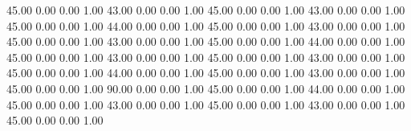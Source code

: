    45.00   0.00   0.00   1.00
   43.00   0.00   0.00   1.00
   45.00   0.00   0.00   1.00
   43.00   0.00   0.00   1.00
   45.00   0.00   0.00   1.00
   44.00   0.00   0.00   1.00
   45.00   0.00   0.00   1.00
   43.00   0.00   0.00   1.00
   45.00   0.00   0.00   1.00
   43.00   0.00   0.00   1.00
   45.00   0.00   0.00   1.00
   44.00   0.00   0.00   1.00
   45.00   0.00   0.00   1.00
   43.00   0.00   0.00   1.00
   45.00   0.00   0.00   1.00
   43.00   0.00   0.00   1.00
   45.00   0.00   0.00   1.00
   44.00   0.00   0.00   1.00
   45.00   0.00   0.00   1.00
   43.00   0.00   0.00   1.00
   45.00   0.00   0.00   1.00
   90.00   0.00   0.00   1.00
   45.00   0.00   0.00   1.00
   44.00   0.00   0.00   1.00
   45.00   0.00   0.00   1.00
   43.00   0.00   0.00   1.00
   45.00   0.00   0.00   1.00
   43.00   0.00   0.00   1.00
   45.00   0.00   0.00   1.00
